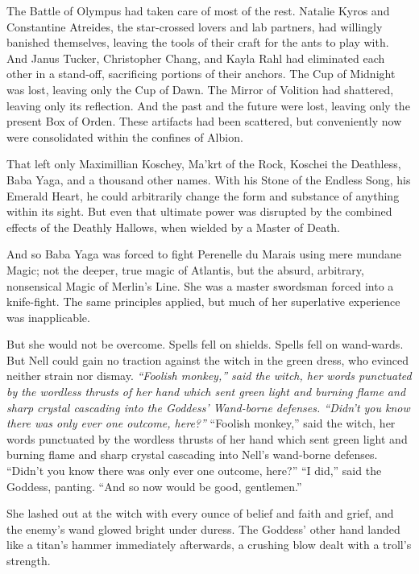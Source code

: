 The Battle of Olympus had taken care of most of the rest. Natalie Kyros and Constantine Atreides, the star-crossed lovers and lab partners, had willingly banished themselves, leaving the tools of their craft for the ants to play with. And Janus Tucker, Christopher Chang, and Kayla Rahl had eliminated each other in a stand-off, sacrificing portions of their anchors. The Cup of Midnight was lost, leaving only the Cup of Dawn. The Mirror of Volition had shattered, leaving only its reflection. And the past and the future were lost, leaving only the present Box of Orden. These artifacts had been scattered, but conveniently now were consolidated within the confines of Albion.

That left only Maximillian Koschey, Ma’krt of the Rock, Koschei the Deathless, Baba Yaga, and a thousand other names. With his Stone of the Endless Song, his Emerald Heart, he could arbitrarily change the form and substance of anything within its sight. But even that ultimate power was disrupted by the combined effects of the Deathly Hallows, when wielded by a Master of Death.

And so Baba Yaga was forced to fight Perenelle du Marais using mere mundane Magic; not the deeper, true magic of Atlantis, but the absurd, arbitrary, nonsensical Magic of Merlin’s Line. She was a master swordsman forced into a knife-fight. The same principles applied, but much of her superlative experience was inapplicable.

But she would not be overcome. Spells fell on shields. Spells fell on wand-wards. But Nell could gain no traction against the witch in the green dress, who evinced neither strain nor dismay.
\simpleline
\emph{
“Foolish monkey,” said the witch, her words punctuated by the wordless thrusts of her hand which sent green light and burning flame and sharp crystal cascading into the Goddess’ Wand-borne defenses. “Didn’t you know there was only ever one outcome, here?”
}
\simpleline
“Foolish monkey,” said the witch, her words punctuated by the wordless thrusts of her hand which sent green light and burning flame and sharp crystal cascading into Nell’s wand-borne defenses. “Didn’t you know there was only ever one outcome, here?”
\simpleline
“I did,” said the Goddess, panting. “And so now would be good, gentlemen.”

She lashed out at the witch with every ounce of belief and faith and grief, and the enemy’s wand glowed bright under duress. The Goddess’ other hand landed like a titan’s hammer immediately afterwards, a crushing blow dealt with a troll’s strength.

